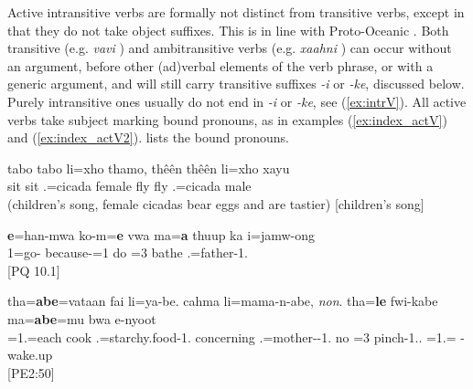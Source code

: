 Active intransitive verbs are formally not distinct from transitive verbs, except in that they do not take object suffixes. This is in line with Proto-Oceanic \parencite[81]{lynch_oceanic_2002}. Both transitive (e.g. \textit{vavi} ) and ambitransitive verbs (e.g. \textit{xaahni} ) can occur without an argument, before other (ad)verbal elements of the verb phrase, or with a generic argument, and will still carry transitive suffixes \textit{-i} or \textit{-ke}, discussed below. Purely intransitive ones usually do not end in \textit{-i} or \textit{-ke}, see (\ref{ex:intrV}). All active verbs take subject marking bound pronouns, as in examples (\ref{ex:index_actV}) and (\ref{ex:index_actV2}).  lists the bound pronouns.

\ea \label{ex:intrV}\gll tabo tabo li=xho thamo, thêên thêên li=xho xayu\\
 sit sit .=cicada female fly fly .=cicada male\\
\glt {} (children's song, female cicadas bear eggs and are tastier) {[children's song]}
\z

\ea \label{ex:index_actV}\gll \textbf{e}=han-mwa ko-m=\textbf{e} vwa ma=\textbf{a} thuup ka i=jamw-ong\\
 1=go- because-=1 do =3 bathe  .=father-1.\\
\glt {} {[PQ 10.1]}
\z


\ea \label{ex:index_actV2}\gll tha=\textbf{abe}=vataan fai li=ya-be. cahma li=mama-n-abe, \textit{non}. tha=\textbf{le} fwi-kabe ma=\textbf{abe}=mu bwa e-nyoot\\
 =1.=each cook .=starchy.food-1. concerning .=mother--1. no =3 pinch-1.. =1.=  -wake.up\\
\glt  {} {[PE2:50]}
\z

